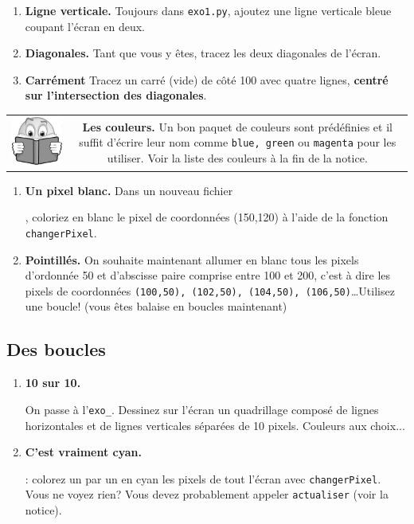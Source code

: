 \documentclass[11pt,a4paper]{article}
\newcommand{\checkbox}{$\square$ \smallskip}
\newenvironment{lecture}{%
\smallskip
\begin{tabular}{c|c}
    \hspace{.03\textwidth} \includegraphics[width=.07\textwidth]{img/lecture.jpg} & 
\begin{minipage}{.85\textwidth}
}{%
\end{minipage}
\end{tabular}
}
\newcounter{exo} \setcounter{exo}{0}
\newenvironment{action}{%
    \begin{enumerate}[\numerotation] \addtocounter{exo}{-1}%
        }{%
    \end{enumerate}
}
\newcommand{\numexoa}{\theexo \addtocounter{exo}{1}}
\newcommand{\numerotation}{\checkbox \smallskip \numexoa.}
\newcounter{exoo} \setcounter{exoo}{0}
\newcommand{\numexo}{\theexoo}
\newcommand{\repexo}{{\tt exo_\numexo}}
\newcommand{\exoplus}{\addtocounter{exoo}{1}}
\begin{document}
\begin{action}
\item {\bf Ligne verticale.} Toujours dans {\tt exo1.py}, ajoutez une ligne verticale bleue coupant l'écran en deux.
\item {\bf Diagonales.} Tant que vous y êtes, tracez les deux diagonales de l'écran.
\item {\bf Carrément} Tracez un carré (vide) de côté 100 avec quatre lignes, {\bf centré sur l'intersection des diagonales}.
\end{action}

\begin{lecture}
    {\bf Les couleurs.} Un bon paquet de couleurs sont prédéfinies et il suffit d'écrire leur nom comme {\tt blue, green} ou {\tt magenta} pour les utiliser. Voir la liste des couleurs à la fin de la notice.
\end{lecture}

\begin{action}
\item {\bf Un pixel blanc.} Dans un nouveau fichier \exoplus \repexo, coloriez en blanc le pixel de coordonnées (150,120) à l'aide de la fonction {\tt changerPixel}.
\item {\bf Pointillés.} On souhaite maintenant allumer en blanc tous les pixels d'ordonnée 50 et d'abscisse paire comprise entre 100 et 200, c'est à dire les pixels de coordonnées {\tt (100,50), (102,50), (104,50), (106,50)}\dots Utilisez une boucle! (vous êtes balaise en boucles maintenant)
\end{action}

\subsection*{Des boucles}
\begin{action}
\item {\bf 10 sur 10.} \exoplus On passe à l'\repexo. 
Dessinez sur l'écran un quadrillage composé de lignes horizontales et de lignes verticales séparées de 10 pixels. Couleurs aux choix...
\item {\bf C'est vraiment cyan.} \exoplus \repexo : colorez un par un en cyan les pixels de tout l'écran avec {\tt changerPixel}. Vous ne voyez rien? Vous devez probablement appeler {\tt actualiser} (voir la notice).
\end{action}
\end{document}

